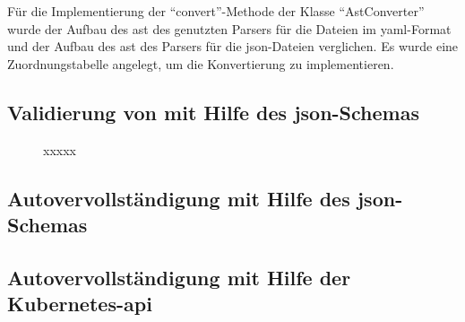 Für die Implementierung der ``convert''-Methode der Klasse ``AstConverter'' wurde der Aufbau des \ac{ast} des genutzten Parsers für
die Dateien im \ac{yaml}-Format und der Aufbau des \ac{ast} des Parsers für die \ac{json}-Dateien verglichen.
Es wurde eine Zuordnungstabelle angelegt, um die Konvertierung zu implementieren.


\subsection{Validierung von mit Hilfe des \acs{json}-Schemas}

\begin{figure}[htp] %
      \centering
      \caption{xxxxx}
      \label{fig:class-diagram-yaml-language-service-validation}
\end{figure}

\subsection{Autovervollständigung mit Hilfe des \acs{json}-Schemas}

\subsection{Autovervollständigung mit Hilfe der Kubernetes-\acs{api}}

